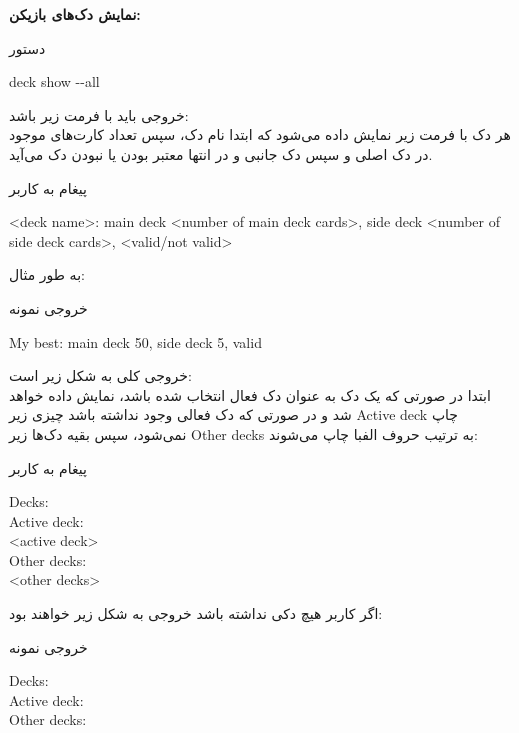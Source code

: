 \documentclass[]{article}
\begin{document}
\textbf{نمایش دک‌های بازیکن:}
\begin{mybox}[colback=yellow]{دستور}
	\begin{latin}	
		deck show -{}-all
	\end{latin}
\end{mybox}
خروجی باید با فرمت زیر باشد:
\\
هر دک با فرمت زیر نمایش داده می‌شود که ابتدا نام دک، سپس تعداد کارت‌های موجود 
در دک اصلی و سپس دک جانبی و در انتها معتبر بودن یا نبودن دک می‌آید.
\begin{mybox}[colback=yellow]{پیغام به کاربر}
	\begin{latin}	
		<deck name>: main deck <number of main deck cards>, side deck <number 
		of side deck cards>, <valid/not valid>
	\end{latin}
\end{mybox}
به طور مثال:
\begin{mybox}[colback=yellow]{خروجی نمونه}
	\begin{latin}	
		My best: main deck 50, side deck 5, valid
	\end{latin}
\end{mybox}
خروجی کلی به شکل زیر است:
\\
ابتدا در صورتی که یک دک به عنوان دک فعال انتخاب شده باشد، نمایش داده خواهد 
شد و در صورتی که دک فعالی وجود نداشته باشد چیزی زیر Active deck چاپ نمی‌شود، 
سپس بقیه دک‌ها زیر Other decks به ترتیب حروف الفبا چاپ می‌شوند:
\begin{mybox}[colback=yellow]{پیغام به کاربر}
	\begin{latin}	
		Decks: \\
		Active deck: \\
		<active deck> \\
		Other decks: \\
		<other decks>
	\end{latin}
\end{mybox}
اگر کاربر هیچ دکی نداشته باشد خروجی به شکل زیر خواهند بود:
\begin{mybox}[colback=yellow]{خروجی نمونه}
	\begin{latin}	
		Decks: \\
		Active deck: \\
		Other decks:
	\end{latin}
\end{mybox}
\end{document}
